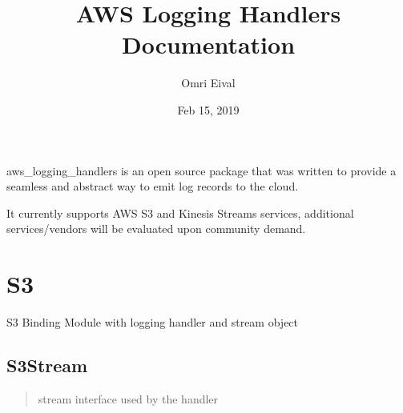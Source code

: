 \documentclass[letterpaper,10pt,english]{sphinxmanual}
\title{AWS Logging Handlers Documentation}
\date{Feb 15, 2019}
\author{Omri Eival}
\begin{document}
\pagestyle{empty}
\sphinxmaketitle
\pagestyle{plain}
\sphinxtableofcontents
\pagestyle{normal}
\label{\detokenize{index::doc}}

aws\_logging\_handlers is an open source package that was written to provide a seamless and abstract way to emit log
records to the cloud.

It currently supports AWS S3 and Kinesis Streams services, additional services/vendors will be
evaluated upon community demand.


\chapter{S3}
\label{\detokenize{s3/index:module-S3}}\label{\detokenize{s3/index:s3}}\label{\detokenize{s3/index::doc}}
S3 Binding Module with logging handler and stream object


\section{S3Stream}
\label{\detokenize{s3/S3Stream:s3stream}}\label{\detokenize{s3/S3Stream::doc}}\begin{quote}

\begin{fulllineitems}
\label{\detokenize{s3/S3Stream:S3.S3Stream}}
stream interface used by the handler

\end{fulllineitems}

\end{quote}
\end{document}
